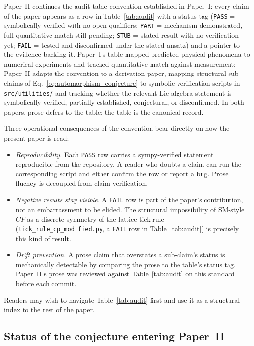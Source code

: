 Paper~II continues the audit-table convention established in
Paper~I: every claim of the paper appears as a row in
Table~\ref{tab:audit} with a status tag (\texttt{PASS} =
symbolically verified with no open qualifiers; \texttt{PART} =
mechanism demonstrated, full quantitative match still pending;
\texttt{STUB} = stated result with no verification yet;
\texttt{FAIL} = tested and disconfirmed under the stated ansatz)
and a pointer to the evidence backing it.  Paper~I's table mapped predicted
physical phenomena to numerical experiments and tracked
quantitative match against measurement; Paper~II adapts the
convention to a derivation paper, mapping structural sub-claims of
Eq.~\eqref{eq:automorphism_conjecture} to symbolic-verification
scripts in \nolinkurl{src/utilities/} and tracking whether the
relevant Lie-algebra statement is symbolically verified, partially
established, conjectural, or disconfirmed.  In both papers, prose defers to the table; the
table is the canonical record.

Three operational consequences of the convention bear directly on
how the present paper is read:

\begin{itemize}
\item \emph{Reproducibility.}  Each \texttt{PASS} row carries a
sympy-verified statement reproducible from the repository.  A
reader who doubts a claim can run the corresponding script and
either confirm the row or report a bug.  Prose fluency is
decoupled from claim verification.

\item \emph{Negative results stay visible.}  A \texttt{FAIL} row
is part of the paper's contribution, not an embarrassment to be
elided.  The structural impossibility of SM-style $CP$ as a
discrete symmetry of the lattice tick rule
(\nolinkurl{tick_rule_cp_modified.py}, a \texttt{FAIL} row in
Table~\ref{tab:audit}) is precisely this kind of result.

\item \emph{Drift prevention.}  A prose claim that overstates a
sub-claim's status is mechanically detectable by comparing the
prose to the table's status tag.  Paper~II's prose was reviewed
against Table~\ref{tab:audit} on this standard before each commit.
\end{itemize}

Readers may wish to navigate Table~\ref{tab:audit} first and use
it as a structural index to the rest of the paper.

\subsection{Status of the conjecture entering Paper~II}
\label{subsec:status_at_entry}

